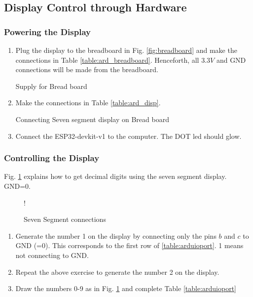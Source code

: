 \subsection{Display Control through Hardware }
\subsubsection{Powering the Display}
\begin{enumerate}[label=\arabic*.,ref=\theenumi]

\item
	Plug the display to the breadboard in Fig. \ref{fig:breadboard} and make the connections in Table \ref{table:ard_breadboard}.  Henceforth, all 3.3$V$ and GND connections will be made from the breadboard.

\begin{table}[H]
\centering

\caption{Supply for Bread board}
\label{table:ard_breadboard}
\end{table}


\item
Make the  connections in Table \ref{table:ard_disp}.  
%
\begin{table}[H]
\centering

\caption{Connecting Seven segment display on Bread board}
\label{table:ard_disp}
\end{table}
%
\item
	Connect the ESP32-devkit-v1 to the computer. The DOT led should glow.
\end{enumerate}
\subsubsection{Controlling the Display}
%
Fig. \ref{fig:sevenseg12} explains how to get decimal digits using the seven segment display. GND=0.  
\begin{figure}[H]
\begin{center}
 {!} {

}
\end{center}
\caption{Seven Segment connections}
\label{fig:sevenseg12}
\end{figure}
\begin{enumerate}[label=\arabic*.,ref=\theenumi]
\item	Generate the number 1 on the display by connecting only the pins $b$ and $c$ to GND (=0). This corresponds to the  first row of \ref{table:arduioport}. 1 means not connecting to GND.
\item
	Repeat the above exercise to generate the number 2 on the display.
%
\item
Draw the numbers 0-9 as in Fig. \ref{fig:sevenseg12} and complete Table \ref{table:arduioport}
%	
\begin{table}[H]
\centering

\caption{}
\label{table:arduioport}
\end{table}
%
%
\end{enumerate}
